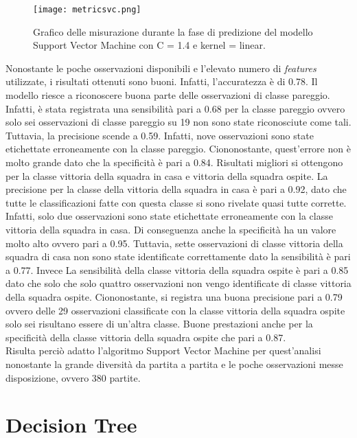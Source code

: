 \begin{figure}[]
	\begin{center}
		\texttt{[image: metricsvc.png]}
		\caption{Grafico delle misurazione durante la fase di predizione del modello Support Vector Machine con C = 1.4 e kernel = linear.
		} 
		\label{fig:svcmetrics}
	\end{center}
\end{figure}
Nonostante le poche osservazioni disponibili e l'elevato numero di \emph{features} utilizzate, i risultati ottenuti sono buoni. Infatti, l'accuratezza è di 0.78. Il modello riesce a riconoscere buona parte delle osservazioni di classe pareggio. Infatti, è stata registrata una sensibilità pari a 0.68 per la classe pareggio ovvero solo sei osservazioni di classe pareggio su 19 non sono state riconosciute come tali. Tuttavia, la precisione scende a 0.59. Infatti, nove osservazioni sono state etichettate erroneamente con la classe pareggio. Ciononostante, quest'errore non è molto grande dato che la specificità è pari a 0.84. Risultati migliori si ottengono per la classe vittoria della squadra in casa e vittoria della squadra ospite. La precisione per la classe della vittoria della squadra in casa è pari a 0.92, dato che tutte le classificazioni fatte con questa classe si sono rivelate quasi tutte corrette. Infatti, solo due osservazioni sono state etichettate erroneamente con la classe vittoria della squadra in casa. Di conseguenza anche la specificità ha un valore molto alto ovvero pari a 0.95. Tuttavia, sette osservazioni di classe vittoria della squadra di casa non sono state identificate correttamente dato la sensibilità è pari a 0.77. Invece La sensibilità della classe vittoria della squadra ospite è pari a 0.85 dato che solo che solo quattro osservazioni non vengo identificate di classe vittoria della squadra ospite. Ciononostante, si registra una buona precisione pari a 0.79 ovvero delle 29 osservazioni classificate con la classe vittoria della squadra ospite solo sei risultano essere di un'altra classe. Buone prestazioni anche per la specificità della classe vittoria della squadra ospite che pari a 0.87.\\
Risulta perciò adatto l'algoritmo Support Vector Machine per quest'analisi nonostante la grande diversità da partita a partita e le poche osservazioni messe disposizione, ovvero 380 partite.


\section{Decision Tree}

